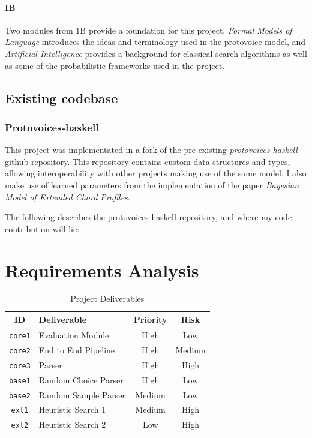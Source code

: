 \documentclass[12pt,a4paper,twoside,openright]{report}
\theoremstyle{definition}
\begin{document}
\paragraph{IB}{ Two modules from 1B provide a foundation for this project. \textit{Formal Models of Language} introduces the ideas and terminology used in the protovoice model, and \textit{Artificial Intelligence} provides a background for classical search algorithms as well as some of the probabilistic frameworks used in the project.}

\subsection{Existing codebase}
\subsubsection{Protovoices-haskell}
This project was implementated in a fork of the pre-existing \textit{protovoices-haskell} github repository. This repository contains custom data structures and types, allowing interoperability with other projects making use of the same model. I also make use of learned parameters from the implementation of the paper \textit{Bayesian Model of Extended Chord Profiles}\cite{finkensiepChordTypesOrnamentation2023}. 

The following describes the protovoices-haskell repository, and where my code contribution will lie:
\par
\medskip
{}

\section{Requirements Analysis}



\begin{table}[ht]
  \caption{Project Deliverables}
  \vspace{\baselineskip}
  \label{requirements}
  \centering
  \begin{tabularx}{0.9\textwidth}{cXcc}
    {\large \textbf{ID}} & \large \textbf{Deliverable} & \large \textbf{Priority} & \large \textbf{Risk} \\
    \toprule
    \texttt{core1} & Evaluation Module & High & Low \\
  \texttt{core2} & End to End Pipeline  & High & Medium \\
    \texttt{core3} & Parser & High & High \\
    \texttt{base1} & Random Choice Parser & High & Low \\
    \texttt{base2} & Random Sample Parser & Medium & Low \\
    \texttt{ext1} & Heuristic Search 1 & Medium & High \\
    \texttt{ext2} & Heuristic Search 2 & Low & High \\
  \end{tabularx}
\end{table}
\end{document}
